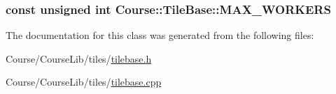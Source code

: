 \hypertarget{classCourse_1_1TileBase_aebadbc88dff462405047769cab680909}{
\subsubsection[{M\-A\-X\-\_\-\-W\-O\-R\-K\-E\-R\-S}]{\setlength{\rightskip}{0pt plus 5cm}const unsigned int Course\-::\-Tile\-Base\-::\-M\-A\-X\-\_\-\-W\-O\-R\-K\-E\-R\-S}}\label{classCourse_1_1TileBase_aebadbc88dff462405047769cab680909}


The documentation for this class was generated from the following files\-:\begin{DoxyCompactItemize}
\item 
Course/\-Course\-Lib/tiles/\hyperlink{tilebase_8h}{tilebase.\-h}\item 
Course/\-Course\-Lib/tiles/\hyperlink{tilebase_8cpp}{tilebase.\-cpp}\end{DoxyCompactItemize}
